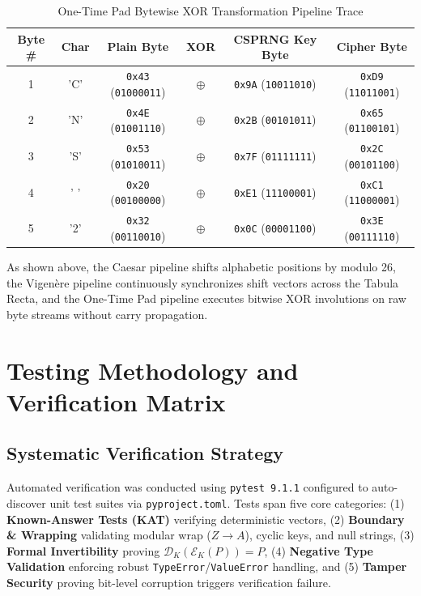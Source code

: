 \documentclass[12pt,a4paper]{report}
\begin{document}
\vspace{-0.5em}

\begin{table}[h!]
\centering
\small
\begin{tabular}{|c|c|c|c|c|c|}
\hline
\rowcolor{tableheader}
\textbf{Byte \#} & \textbf{Char} & \textbf{Plain Byte} & \textbf{XOR} & \textbf{CSPRNG Key Byte} & \textbf{Cipher Byte} \\
\hline
1 & 'C' & \texttt{0x43} (\texttt{01000011}) & $\oplus$ & \texttt{0x9A} (\texttt{10011010}) & \texttt{0xD9} (\texttt{11011001}) \\
\hline
2 & 'N' & \texttt{0x4E} (\texttt{01001110}) & $\oplus$ & \texttt{0x2B} (\texttt{00101011}) & \texttt{0x65} (\texttt{01100101}) \\
\hline
3 & 'S' & \texttt{0x53} (\texttt{01010011}) & $\oplus$ & \texttt{0x7F} (\texttt{01111111}) & \texttt{0x2C} (\texttt{00101100}) \\
\hline
4 & ' ' & \texttt{0x20} (\texttt{00100000}) & $\oplus$ & \texttt{0xE1} (\texttt{11100001}) & \texttt{0xC1} (\texttt{11000001}) \\
\hline
5 & '2' & \texttt{0x32} (\texttt{00110010}) & $\oplus$ & \texttt{0x0C} (\texttt{00001100}) & \texttt{0x3E} (\texttt{00111110}) \\
\hline
\end{tabular}
\caption{One-Time Pad Bytewise XOR Transformation Pipeline Trace}
\label{tab:pipe_otp}
\end{table}

As shown above, the Caesar pipeline shifts alphabetic positions by modulo 26, the Vigen\`ere pipeline continuously synchronizes shift vectors across the Tabula Recta, and the One-Time Pad pipeline executes bitwise XOR involutions on raw byte streams without carry propagation.

\newpage

\chapter{Testing Methodology and Verification Matrix}

\section{Systematic Verification Strategy}
Automated verification was conducted using \texttt{pytest 9.1.1} configured to auto-discover unit test suites via \texttt{pyproject.toml}. Tests span five core categories: (1) \textbf{Known-Answer Tests (KAT)} verifying deterministic vectors, (2) \textbf{Boundary \& Wrapping} validating modular wrap ($Z \to A$), cyclic keys, and null strings, (3) \textbf{Formal Invertibility} proving $\mathcal{D}_K(\mathcal{E}_K(P)) = P$, (4) \textbf{Negative Type Validation} enforcing robust \texttt{TypeError}/\texttt{ValueError} handling, and (5) \textbf{Tamper Security} proving bit-level corruption triggers verification failure.
\end{document}
